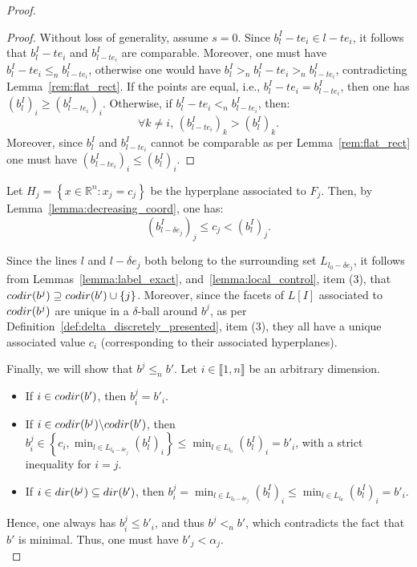 \documentclass{article}
\newcommand{\dir}[1]{ {\rm dir}(#1) }
\newcommand{\codir}[1]{ {\rm codir}(#1) }
\newcommand{\R}{\mathbb{R}}
\newcommand{\leqn}{\leq_n}
\newcommand{\sln}{<_n}
\newcommand{\sgn}{>_n}
\newcommand{\lowerb}[1]{ L[#1] }
\begin{document}
\begin{proof}
		\begin{proof}
			Without loss of generality, assume $s=0$.
			Since $b^I_l - t e_i \in l-te_i$, it follows that $b^I_l-te_i$ and $b^I_{l-te_i}$ are comparable. Moreover, one must have $b^I_l-te_i \leqn b^I_{l-te_i}$, otherwise one would have
			$b^I_l \sgn b^I_l-te_i \sgn b^I_{l-te_i}$, contradicting Lemma~\ref{rem:flat_rect}.
			If the points are equal, i.e., $b^I_l-te_i = b^I_{l-te_i}$, then one has $(b^I_l)_i \geq (b^I_{l-te_i})_i$. Otherwise, if $b^I_l-te_i \sln b^I_{l-te_i}$, then:
			\begin{equation*}
				\forall k\neq i, \, (b^I_{l-te_i})_k > (b^I_{l})_k.
			\end{equation*}
			Moreover, since $b^I_l$ and $b^I_{l-te_i}$ cannot be comparable as per Lemma~\ref{rem:flat_rect}
			one must have $(b^I_{l -te_i})_i\le (b^I_l)_i$. %

		\end{proof}
		Let $H_j = \left\{ x\in\R^n : x_j = c_j \right\}$ be the hyperplane associated to $F_j$.
		Then, by Lemma~\ref{lemma:decreasing_coord}, one has:
		\begin{equation*}
			(b_{l- \delta e_j}^I)_j \le c_j < (b_l^I)_j.
		\end{equation*}


		Since the lines $l$ and $l-\delta e_j$ both belong to the surrounding set $L_{l_0-\delta e_j}$,
		it follows from Lemmas~\ref{lemma:label_exact}, and~\ref{lemma:local_control}, item (3), that
		$\codir{b^j} \supseteq \codir{b'}\cup \left\{ j \right\}$. Moreover, since the facets of $\lowerb{I}$ associated to $\codir{b^j}$ are unique in a $\delta$-ball around $b^j$,
		as per Definition~\ref{def:delta_discretely_presented}, item (3), they all have a unique associated value $c_i$ (corresponding to their associated hyperplanes).

		Finally, we will show that $b^j\leqn b'$.
		Let $i\in\llbracket 1,n \rrbracket$ be an arbitrary dimension.
		\begin{itemize}
			\item If $i \in \codir{b'}$, then $b^j_i = b'_i$.
			\item If $i \in \codir{b^j} \backslash \codir{b'}$, then $b^j_i \in \left\{
				c_i, \min_{l \in L_{l_0-\delta e_j}}(b_l^I)_i\right\} \le \min_{l \in L_{l_0}}(b_l^I)_i = b'_i$, with a strict inequality for $i=j$.
			\item If $i \in \dir{b^j} \subseteq \dir{b'}$, then
				$b^j_i =  \min_{l \in L_{l_0- \delta e_j}}(b_l^I)_i \le  \min_{l \in L_{l_0}}(b_l^I)_i = b'_i$.
		\end{itemize}
		Hence, one always has $b^j_i\leq b'_i$, and thus $b^j \sln b'$, which contradicts the fact that $b'$ is minimal. Thus, one must have $b'_j < \alpha_j$.
		\\


\end{proof}
\end{document}
